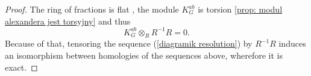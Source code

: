 \begin{proof}
  The ring of fractions is flat \cite[Chapter~3]{atiyah}, the module $K_G^{ab}$ is torsion \cref{prop: modul alexandera jest torsyjny} and thus
  $$K_G^{ab}\otimes_R R^{-1}R=0.$$
  Because of that, tensoring the sequence (\ref{diagramik resolution}) by $R^{-1}R$ {\large\color{red}induces an isomorphism between homologies of the sequences above}, wherefore it is exact.
%
%
%
\end{proof}


